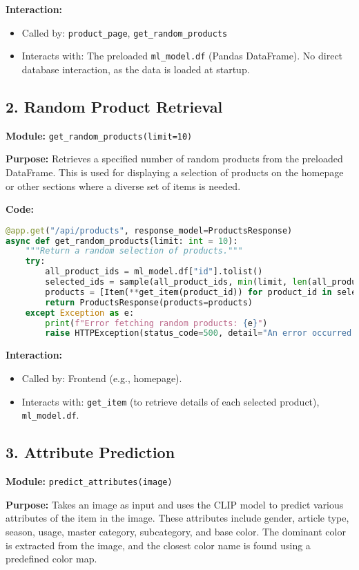 \documentclass[12pt,a4paper]{article}
\begin{document}
\textbf{Interaction:}
\begin{itemize}
    \item Called by: \texttt{product\_page}, \texttt{get\_random\_products}
    \item Interacts with:  The preloaded \texttt{ml\_model.df} (Pandas DataFrame).  No direct database interaction, as the data is loaded at startup.
\end{itemize}

\subsection*{2. Random Product Retrieval}
\textbf{Module:} \texttt{get\_random\_products(limit=10)}

\textbf{Purpose:}  Retrieves a specified number of random products from the preloaded DataFrame. This is used for displaying a selection of products on the homepage or other sections where a diverse set of items is needed.

\textbf{Code:}
\begin{lstlisting}[language=Python]
@app.get("/api/products", response_model=ProductsResponse)
async def get_random_products(limit: int = 10):
    """Return a random selection of products."""
    try:
        all_product_ids = ml_model.df["id"].tolist()
        selected_ids = sample(all_product_ids, min(limit, len(all_product_ids)))
        products = [Item(**get_item(product_id)) for product_id in selected_ids]
        return ProductsResponse(products=products)
    except Exception as e:
        print(f"Error fetching random products: {e}")
        raise HTTPException(status_code=500, detail="An error occurred while fetching random products")
\end{lstlisting}

\textbf{Interaction:}
\begin{itemize}
    \item Called by:  Frontend (e.g., homepage).
    \item Interacts with:  \texttt{get\_item} (to retrieve details of each selected product), \texttt{ml\_model.df}.
\end{itemize}

\subsection*{3. Attribute Prediction}
\textbf{Module:} \texttt{predict\_attributes(image)}

\textbf{Purpose:}  Takes an image as input and uses the CLIP model to predict various attributes of the item in the image.  These attributes include gender, article type, season, usage, master category, subcategory, and base color.  The dominant color is extracted from the image, and the closest color name is found using a predefined color map.
\end{document}
